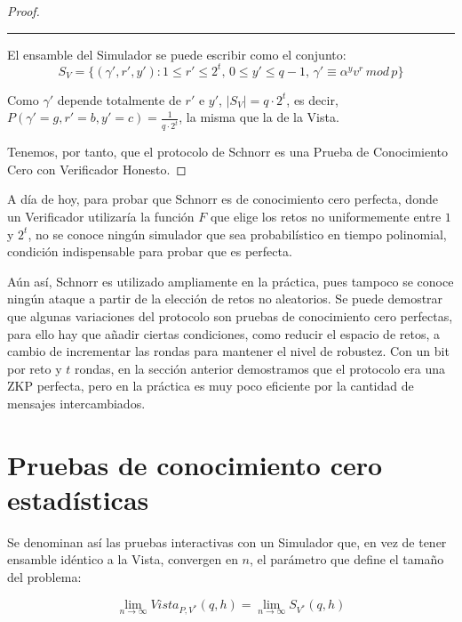 \begin{proof}
\begin{algorithm}
\begin{enumerate}
	\end{enumerate}
	
\end{algorithm}
\rule{\textwidth}{1pt}


El ensamble del Simulador se puede escribir como el conjunto:
\[
S_{V} = \{ (\gamma', r', y') : 1\leq r' \leq 2^t,\, 0\leq y'\leq q-1,\, \gamma' \equiv \alpha^y v^r \, mod \, p \}
\]

Como $\gamma'$ depende totalmente de $r'$ e $y'$, $\mid S_V \mid = q\cdot 2^t$, es decir, $P(\gamma'=g, r'=b, y'=c)=\frac{1}{q\cdot 2^t}$, la misma que la de la Vista. 


Tenemos, por tanto, que el protocolo de Schnorr es una Prueba de Conocimiento Cero con Verificador Honesto.

\end{proof}

\hfil

A día de hoy, para probar que Schnorr es de conocimiento cero perfecta, donde un Verificador utilizaría la función $F$ que elige los retos no uniformemente entre $1$ y $2^t$, no se conoce ningún simulador que sea probabilístico en tiempo polinomial, condición indispensable para probar que es perfecta.


Aún así, Schnorr es utilizado ampliamente en la práctica, pues tampoco se conoce ningún ataque a partir de la elección de retos no aleatorios. Se puede demostrar que algunas variaciones del protocolo son pruebas de conocimiento cero perfectas, para ello hay que añadir ciertas condiciones, como reducir el espacio de retos, a cambio de incrementar las rondas para mantener el nivel de robustez. Con un bit por reto y $t$ rondas, en la sección anterior demostramos que el protocolo era una ZKP perfecta, pero en la práctica es muy poco eficiente por la cantidad de mensajes intercambiados.




\section{Pruebas de conocimiento cero estadísticas}

Se denominan así las pruebas interactivas con un Simulador que, en vez de tener ensamble idéntico a la Vista, convergen en $n$, el parámetro que define el tamaño del problema:
\begin{center}
	$$
	\lim_{n\to\infty} Vista_{P,V^*}(q,h) =  \lim_{n\to\infty} S_{V^*}(q,h)
	$$
\end{center}

